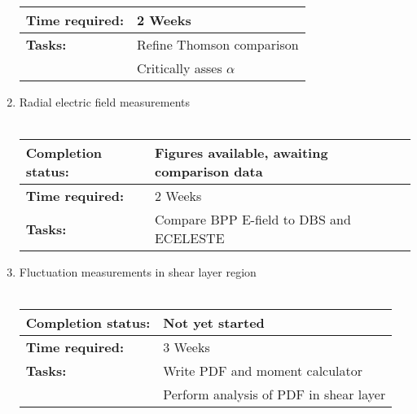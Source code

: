 \documentclass[11pt]{article}
\begin{document}
\begin{enumerate}
\begin{tabular}{l l}
\hline
  \textbf{Time required:} & 2 Weeks \\
\hline
\textbf{Tasks:} & Refine Thomson comparison \\
 & Critically asses $\alpha$ 
\end{tabular}
\item Radial electric field measurements\\ \\
\begin{tabular}{l l}
\hline
\textbf{Completion status:} &  Figures available, awaiting comparison data \\
\hline
  \textbf{Time required:} & 2 Weeks \\
\hline
\textbf{Tasks:} & Compare BPP E-field to DBS and ECELESTE
\end{tabular}
\item Fluctuation measurements in shear layer region\\ \\
\begin{tabular}{l l}
\hline
\textbf{Completion status:} &  Not yet started \\
\hline
  \textbf{Time required:} & 3 Weeks \\
\hline
\textbf{Tasks:} & Write PDF and moment calculator\\
 & Perform analysis of PDF in shear layer
\end{tabular}



\end{enumerate}
\newpage
\end{document}
